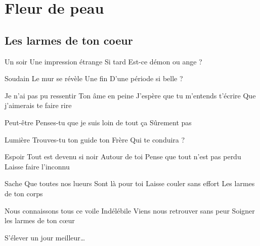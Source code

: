\documentclass{article}
\newenvironment{album}[1]%
{%
  \section*{#1}
}%
{%
}
\newenvironment{song}[1]%
{%
  \subsection*{\textbf{#1}}
  \begin{multicols*}{2}
}%
{%
  \end{multicols*}
  \newpage
}
\newenvironment{couplet} %
{%
  \verbatim
}%
{% end code
  \endverbatim
}
\newenvironment{refrain} %
{%
  \verbatim
}%
{% end code
  \endverbatim
}
\begin{document}
\begin{album}{Fleur de peau}
\begin{song}{Les larmes de ton coeur}
\begin{couplet}
Un soir
Une impression étrange
Si tard
Est-ce démon ou ange ?  
\end{couplet}
\begin{couplet}
Soudain
Le mur se révèle
Une fin
D'une période si belle ?
\end{couplet}
\begin{refrain}
Je n'ai pas pu ressentir
Ton âme en peine
J'espère que tu m'entends t'écrire
Que j'aimerais te faire rire
\end{refrain}
\begin{couplet}
Peut-être
Penses-tu que je suis loin de tout ça
Sûrement pas
\end{couplet}
\begin{couplet}
Lumière
Trouves-tu ton guide ton
Frère
Qui te conduira ?
\end{couplet}
\begin{refrain}
Espoir
Tout est devenu si noir
Autour de toi
Pense que tout n'est pas perdu
Laisse faire l'inconnu
\end{refrain}
\begin{refrain}
Sache
Que toutes nos lueurs
Sont là pour toi
Laisse couler sans effort
Les larmes de ton corps
\end{refrain}
\begin{refrain}
Nous connaissons tous ce voile
Indélébile
Viens nous retrouver sans peur
Soigner les larmes de ton cœur

S'élever un jour meilleur…
\end{refrain}
\end{song}


\end{album}
\end{document}
